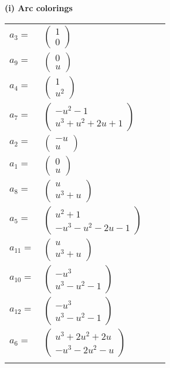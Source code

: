 \documentclass[1p]{elsarticle_modified}
\theoremstyle{definition}
\begin{document}
\flushleft \textbf{(i) Arc colorings}\\
\begin{tabular}{m{7pt} m{180pt} m{7pt} m{180pt} }
\flushright $a_{3}=$&$\begin{pmatrix}1\\0\end{pmatrix}$ \\
\flushright $a_{9}=$&$\begin{pmatrix}0\\u\end{pmatrix}$ \\
\flushright $a_{4}=$&$\begin{pmatrix}1\\u^2\end{pmatrix}$ \\
\flushright $a_{7}=$&$\begin{pmatrix}- u^2-1\\u^3+u^2+2 u+1\end{pmatrix}$ \\
\flushright $a_{2}=$&$\begin{pmatrix}- u\\u\end{pmatrix}$ \\
\flushright $a_{1}=$&$\begin{pmatrix}0\\u\end{pmatrix}$ \\
\flushright $a_{8}=$&$\begin{pmatrix}u\\u^3+u\end{pmatrix}$ \\
\flushright $a_{5}=$&$\begin{pmatrix}u^2+1\\- u^3- u^2-2 u-1\end{pmatrix}$ \\
\flushright $a_{11}=$&$\begin{pmatrix}u\\u^3+u\end{pmatrix}$ \\
\flushright $a_{10}=$&$\begin{pmatrix}- u^3\\u^3- u^2-1\end{pmatrix}$ \\
\flushright $a_{12}=$&$\begin{pmatrix}- u^3\\u^3- u^2-1\end{pmatrix}$ \\
\flushright $a_{6}=$&$\begin{pmatrix}u^3+2 u^2+2 u\\- u^3-2 u^2- u\end{pmatrix}$\\&\end{tabular}
\end{document}
